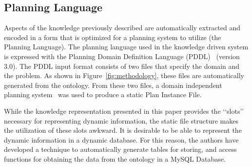 

\subsection{Planning Language}
\label{subsection:planning_language}
Aspects of the knowledge previously described are automatically extracted and encoded in a form that is optimized for a planning system to utilize (the Planning Language). The planning language used in the knowledge driven system is expressed with the Planning Domain Definition Language (PDDL)~\cite{PDDL} (version 3.0). The PDDL input format consists of two files that specify the domain and the problem. As shown in Figure~\ref{fig:methodology}, these files are automatically generated from the ontology. From these two files, a domain independent planning system~\cite{Coles.ICAPS.2010} was used to produce a static \textsf{Plan Instance File}.



While the knowledge representation presented in this paper provides the \lq\lq{}slots\rq\rq{} necessary for representing dynamic information, the
static file structure makes the utilization of these slots awkward. It is desirable to be able to represent the dynamic information in a dynamic database.
For this reason, the authors have developed a technique to automatically generate tables for storing, and access functions
for obtaining the data from the ontology in a \textsf{MySQL Database}. 

